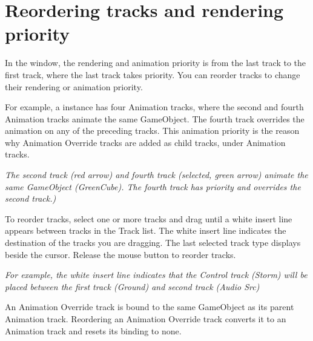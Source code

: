\chapter{Reordering tracks and rendering priority}
\hypertarget{md__library_2_package_cache_2com_8unity_8timeline_0d1_87_86_2_documentation_0i_2trk__reorder}{}\label{md__library_2_package_cache_2com_8unity_8timeline_0d1_87_86_2_documentation_0i_2trk__reorder}
\label{md__library_2_package_cache_2com_8unity_8timeline_0d1_87_86_2_documentation_0i_2trk__reorder_autotoc_md1262}%
%
 In the  window, the rendering and animation priority is from the last track to the first track, where the last track takes priority. You can reorder tracks to change their rendering or animation priority.

For example, a  instance has four Animation tracks, where the second and fourth Animation tracks animate the same Game\+Object. The fourth track overrides the animation on any of the preceding tracks. This animation priority is the reason why Animation Override tracks are added as child tracks, under Animation tracks.



{\itshape The second track (red arrow) and fourth track (selected, green arrow) animate the same Game\+Object (Green\+Cube). The fourth track has priority and overrides the second track.)}

To reorder tracks, select one or more tracks and drag until a white insert line appears between tracks in the Track list. The white insert line indicates the destination of the tracks you are dragging. The last selected track type displays beside the cursor. Release the mouse button to reorder tracks.



{\itshape For example, the white insert line indicates that the Control track (Storm) will be placed between the first track (Ground) and second track (Audio Src)}

An Animation Override track is bound to the same Game\+Object as its parent Animation track. Reordering an Animation Override track converts it to an Animation track and resets its binding to none. 